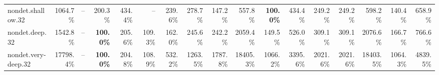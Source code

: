 \documentclass{article}
\begin{document}
\begin{center}
{\begin{tabular}{lrrrrrrrrrrrrrrrr}
nondet.shallow.32 & 1064.7\% & -- & 200.3\% & 434.4\% & -- & 239.6\% & 278.7\% & 147.2\% & 557.8\% & \textbf{100.0\%} & 434.4\% & 249.2\% & 249.2\% & 598.2\% & 140.4\% & 658.9\% \\
nondet.deep.32 & 1542.8\% & -- & \textbf{100.0\%} & 205.6\% & 109.3\% & 162.0\% & 245.6\% & 242.2\% & 2059.4\% & 149.5\% & 526.0\% & 309.1\% & 309.1\% & 2076.6\% & 166.7\% & 766.6\% \\
nondet.very-deep.32 & 17798.4\% & -- & \textbf{100.0\%} & 204.8\% & 108.9\% & 532.2\% & 1263.5\% & 1787.8\% & 18405.3\% & 1066.2\% & 3395.6\% & 2021.6\% & 2021.6\% & 18403.5\% & 1064.3\% & 4839.5\% \\
\bottomrule
\end{tabular}
}
\end{center}
\end{document}
